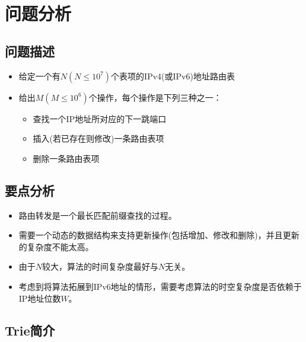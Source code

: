 
\section{问题分析}

\subsection{问题描述}

\begin{itemize}
\item 给定一个有$N(N\leq10^{7})$个表项的IPv4(或IPv6)地址路由表
\item 给出$M(M\leq10^{6})$个操作，每个操作是下列三种之一：
\begin{itemize}
\item 查找一个IP地址所对应的下一跳端口
\item 插入(若已存在则修改)一条路由表项
\item 删除一条路由表项
\end{itemize}
\end{itemize}

\subsection{要点分析}

\begin{itemize}
\item 路由转发是一个最长匹配前缀查找的过程。
\item 需要一个动态的数据结构来支持更新操作(包括增加、修改和删除)，并且更新的复杂度不能太高。
\item 由于$N$较大，算法的时间复杂度最好与$N$无关。
\item 考虑到将算法拓展到IPv6地址的情形，需要考虑算法的时空复杂度是否依赖于IP地址位数$W$。
\end{itemize}

\subsection{Trie简介}

